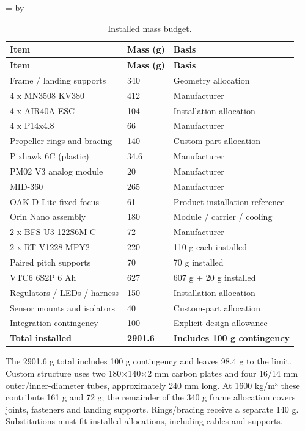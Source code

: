 \documentclass[a4paper,11pt]{article}
\newcommand{\reportneedspace}[1]{\par\begingroup\dimen0=\pagegoal\advance\dimen0 by-\pagetotal\ifdim\dimen0<#1\newpage\fi\endgroup}
\begin{document}
\reportneedspace{8\baselineskip}\begin{longtable}{C{0.440\dimexpr\linewidth-24pt\relax}C{0.130\dimexpr\linewidth-24pt\relax}C{0.430\dimexpr\linewidth-24pt\relax}}
\caption{Installed mass budget.}\label{tab:4}\\
\toprule
\textbf{Item} & \textbf{Mass (g)} & \textbf{Basis}\\\midrule
\endfirsthead
\toprule
\textbf{Item} & \textbf{Mass (g)} & \textbf{Basis}\\\midrule
\endhead
Frame / landing supports & 340 & Geometry allocation\\
4 x MN3508 KV380 & 412 & Manufacturer \cite{r6}\\
4 x AIR40A ESC & 104 & Installation allocation \cite{r7}\\
4 x P14x4.8 & 66 & Manufacturer \cite{r8}\\
Propeller rings and bracing & 140 & Custom-part allocation\\
Pixhawk 6C (plastic) & 34.6 & Manufacturer \cite{r10}\\
PM02 V3 analog module & 20 & Manufacturer \cite{r11}\\
MID-360 & 265 & Manufacturer \cite{r12}\\
OAK-D Lite fixed-focus & 61 & Product installation reference \cite{r13}\\
Orin Nano assembly & 180 & Module / carrier / cooling \cite{r14,r15}\\
2 x BFS-U3-122S6M-C & 72 & Manufacturer \cite{r35}\\
2 x RT-V1228-MPY2 & 220 & 110 g each installed \cite{r36}\\
Paired pitch supports & 70 & 70 g installed \cite{r18}\\
VTC6 6S2P 6 Ah & 627 & 607 g + 20 g installed \cite{r37}\\
Regulators / LEDs / harness & 150 & Installation allocation \cite{r11,r33,r34}\\
Sensor mounts and isolators & 40 & Custom-part allocation\\
Integration contingency & 100 & Explicit design allowance\\
\textbf{Total installed} & \textbf{2901.6} & \textbf{Includes 100 g contingency}\\
\bottomrule\end{longtable}
The 2901.6 g total includes 100 g contingency and leaves 98.4 g to the limit. Custom structure uses two 180×140×2 mm carbon plates and four 16/14 mm outer/inner-diameter tubes, approximately 240 mm long. At 1600 kg/m³ these contribute 161 g and 72 g; the remainder of the 340 g frame allocation covers joints, fasteners and landing supports. Rings/bracing receive a separate 140 g. Substitutions must fit installed allocations, including cables and supports.
\end{document}
